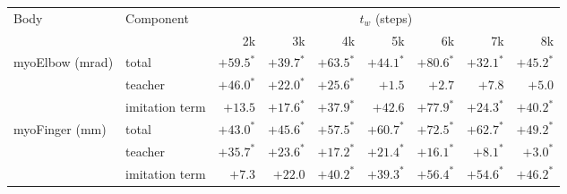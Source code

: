 \begin{tabular}{@{}llrrrrrrr@{}}
\toprule
Body & Component & \multicolumn{7}{c}{$t_w$ (steps)}\\
\cmidrule(lr){3-9}
 & & 2k & 3k & 4k & 5k & 6k & 7k & 8k\\
\midrule
myoElbow (mrad) & total & $+59.5^{*}$ & $+39.7^{*}$ & $+63.5^{*}$ & $+44.1^{*}$ & $+80.6^{*}$ & $+32.1^{*}$ & $+45.2^{*}$\\
 & teacher & $+46.0^{*}$ & $+22.0^{*}$ & $+25.6^{*}$ & $+1.5$ & $+2.7$ & $+7.8$ & $+5.0$\\
 & imitation term & $+13.5$ & $+17.6^{*}$ & $+37.9^{*}$ & $+42.6$ & $+77.9^{*}$ & $+24.3^{*}$ & $+40.2^{*}$\\
\midrule
myoFinger (mm) & total & $+43.0^{*}$ & $+45.6^{*}$ & $+57.5^{*}$ & $+60.7^{*}$ & $+72.5^{*}$ & $+62.7^{*}$ & $+49.2^{*}$\\
 & teacher & $+35.7^{*}$ & $+23.6^{*}$ & $+17.2^{*}$ & $+21.4^{*}$ & $+16.1^{*}$ & $+8.1^{*}$ & $+3.0^{*}$\\
 & imitation term & $+7.3$ & $+22.0$ & $+40.2^{*}$ & $+39.3^{*}$ & $+56.4^{*}$ & $+54.6^{*}$ & $+46.2^{*}$\\
\bottomrule
\end{tabular}
